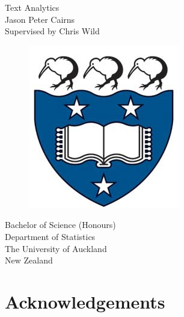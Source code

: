 \documentclass[11pt, a4paper, twoside, titlepage]{report}
\newcommand\blankpage{
  \null{}
  \thispagestyle{empty}
  \addtocounter{page}{-1}
  \newpage}
\begin{document}
\begin{titlepage}
  \centering
  \vspace*{2.5cm}
  {\Huge Text Analytics}\\
  \vspace{1.5cm}
  {\Large Jason Peter Cairns}\\
  \vspace{1.5cm}
  Supervised by Chris Wild\\
  \vspace{1.5cm}
  \begin{figure}[h]
    \centering
    \includegraphics[scale=0.4]{img/logo.jpg}
  \end{figure}
  \vspace{1cm}
  Bachelor of Science (Honours)\\
  Department of Statistics\\
  The University of Auckland\\
  New Zealand
\end{titlepage}

\blankpage{}

\begin{abstract}
Text Analytics serves to glean insights from a body of text. Within
the broad category of text analytics, we seek to answer questions
about what the text is communicating, what is felt about it, and how
this information is structured. This report describes the creation of
a user-friendly program to perform text analytics functions using
modern R with the Shiny web application framework. A literate style
illustrates top-down the structure of such a program, as well as the
data structures and computational processes that have established
their value for it.
\end{abstract}

\chapter*{Acknowledgements}\label{cha:acknowledgements}
\end{document}
